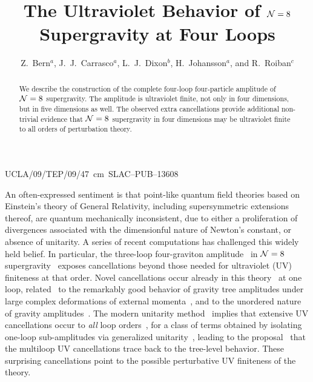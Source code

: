 \documentclass[aps,prl,twocolumn,groupedaddress,draft,showpacs,nofootinbib]{revtex4}
\newif\ifpreprint
\def\NeqEight{{{\cal N}=8}}
\begin{document}
\hbox{UCLA/09/TEP/09/47
 cm  SLAC--PUB--13608}


\title{The Ultraviolet Behavior of $\NeqEight$ Supergravity at Four
      Loops}

\author{Z.~Bern${}^a$, J.~J.~Carrasco${}^a$, L.~J.~Dixon${}^{b}$,
 H.~Johansson${}^a$, 
 and  R.~Roiban${}^c$ }

\begin{abstract}
We describe the construction of the complete four-loop four-particle
amplitude of $\NeqEight$ supergravity.  The amplitude is ultraviolet
finite, not only in four dimensions, but in five
dimensions as well.  The observed extra cancellations provide additional
non-trivial evidence that $\NeqEight$ supergravity in four dimensions
may be ultraviolet finite to all orders of perturbation theory.
\end{abstract}


\maketitle

An often-expressed sentiment is that point-like quantum field theories
based on Einstein's theory of General Relativity, including
supersymmetric extensions thereof, are quantum mechanically
inconsistent, due to either a proliferation of divergences associated
with the dimensionful nature of Newton's constant, or absence of
unitarity.  A series of recent computations has challenged this widely
held belief.  In particular, the three-loop four-graviton
amplitude~\cite{GravityThree,CompactThree} in $\NeqEight$
supergravity~\cite{CremmerJulia} exposes cancellations beyond those
needed for ultraviolet (UV) finiteness at that order.  Novel
cancellations occur already in this theory~\cite{NoTriangle,
VanhoveOrderless} at one loop, related~\cite{UnexpectedOneloop,
Simplest} to the remarkably good behavior of gravity tree amplitudes
under large complex deformations of external
momenta~\cite{GravityLargeZ, Simplest}, and to the unordered nature of
gravity amplitudes~\cite{VanhoveOrderless}.  The modern unitarity
method~\cite{UnitarityMethod} implies that extensive UV cancellations
occur to {\it all} loop orders~\cite{Finite}, for a class of terms
obtained by isolating one-loop sub-amplitudes via generalized
unitarity~\cite{GeneralizedUnitarity}, leading to the 
proposal~\cite{UnexpectedOneloop} that the multiloop UV cancellations
trace back to the tree-level behavior.
These surprising cancellations
point to the possible perturbative UV finiteness of the theory.
\end{document}
